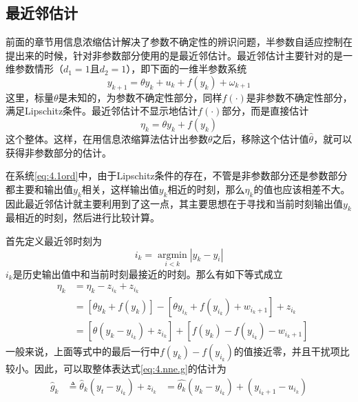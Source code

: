 \subsection{最近邻估计}
前面的章节用信息浓缩估计解决了参数不确定性的辨识问题，半参数自适应控制在提出来的时候，针对非参数部分使用的是最近邻估计。最近邻估计主要针对的是一维参数情形（$d_{1}=1$且$d_{2}=1$），即下面的一维半参数系统
\begin{equation}%
\label{eq:4.1ord}
y_{k+1}=\theta y_{k}+u_{k}+f(y_{k})+\omega_{k+1}
\end{equation}
这里，标量$\theta$是未知的，为参数不确定性部分，同样$f(\cdot)$是非参数不确定性部分，满足Lipschitz条件。最近邻估计不显示地估计$f(\cdot)$部分，而是直接估计
\begin{equation}\label{eq:4.nne.g}
\eta_{k} = \theta y_{k}+f(y_{k})
\end{equation}
这个整体。这样，在用信息浓缩算法估计出参数$\theta$之后，移除这个估计值$\hat{\theta}$，就可以获得非参数部分的估计。

在系统\eqref{eq:4.1ord}中，由于Lipschitz条件的存在，不管是非参数部分还是参数部分都主要和输出值$y_{k}$相关，这样输出值$y_{k}$相近的时刻，那么$\eta_{k}$的值也应该相差不大。因此最近邻估计就主要利用到了这一点，其主要思想在于寻找和当前时刻输出值$y_{k}$最相近的时刻，然后进行比较计算。

首先定义最近邻时刻为
\begin{equation}\label{eq:4.it}
i_k=\mathop{\arg \min}\limits_{i<k}|y_k-y_i|
\end{equation}
$i_k$是历史输出值中和当前时刻最接近的时刻。那么有如下等式成立
\begin{equation*}
\begin{array}{lll}
&\eta_k&=\eta_k-z_{i_k}+z_{i_k}\\
&&=[\theta y_k+f(y_k)]-[\theta y_{i_k}+f(y_{i_k})+w_{i_k+1}]+z_{i_k}\\
&&=[\theta(y_k-y_{i_k})+z_{i_k}]+[f(y_k)-f(y_{i_k})-w_{i_k+1}]
\end{array}
\end{equation*}
一般来说，上面等式中的最后一行中$f(y_k)-f(y_{i_k})$的值接近零，并且干扰项比较小。因此，可以取整体表达式\eqref{eq:4.nne.g}的估计为
\begin{equation}\label{eq.4:g.est}
\begin{array}{lll}
\hat{g}_k&\triangleq\hat{\theta}_k(y_t-y_{i_k})+z_{i_k}
&=\hat{\theta_k}(y_k-y_{i_k})+(y_{i_k+1}-u_{i_k})
\end{array}
\end{equation}

